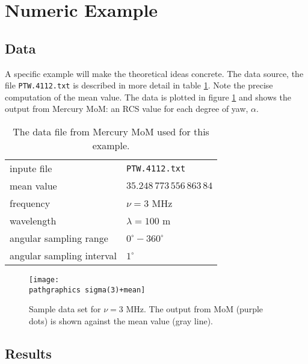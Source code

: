 % 

\section{Numeric Example}

\subsection{Data}
A specific example will make the theoretical ideas concrete. The data source, the file \texttt{PTW.4112.txt} is described in more detail in table \ref{tab:PTW.4112.txt}. Note the precise computation of the mean value. The data is plotted in figure \ref{fig:sample-data} and shows the output from Mercury MoM: an RCS value for each degree of yaw, $\alpha$.

\begin{table}
	\begin{center}
		\begin{tabular}{ll}
			inpute file & \texttt{PTW.4112.txt} \\
			mean value & $35.248 \, 773 \, 556 \, 863 \, 84$ \\
			frequency & $\nu = 3$ MHz \\
			wavelength & $\lambda = 100$ m \\
			angular sampling range & $0^{\circ} - 360^{\circ}$ \\
			angular sampling interval & $1^{\circ}$
		\end{tabular}
	\end{center}
\caption{The data file from Mercury MoM used for this example.}
\label{tab:PTW.4112.txt}
\end{table}

\begin{figure}[htbp]
	\begin{center}
		\texttt{[image: \\pathgraphics sigma(3)+mean]}
	\end{center}
\caption{Sample data set for $\nu=3$ MHz. The output from MoM (purple dots) is shown against the mean value (gray line).}
\label{fig:sample-data}
\end{figure}

\subsection{Results}

